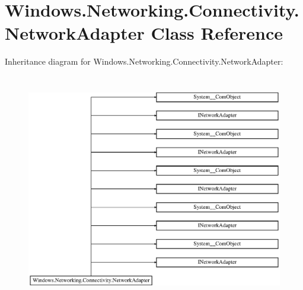 \hypertarget{class_windows_1_1_networking_1_1_connectivity_1_1_network_adapter}{}\section{Windows.\+Networking.\+Connectivity.\+Network\+Adapter Class Reference}
\label{class_windows_1_1_networking_1_1_connectivity_1_1_network_adapter}
Inheritance diagram for Windows.\+Networking.\+Connectivity.\+Network\+Adapter\+:\begin{figure}[H]
\begin{center}
\leavevmode
\includegraphics[height=10.065359cm]{class_windows_1_1_networking_1_1_connectivity_1_1_network_adapter}
\end{center}
\end{figure}
